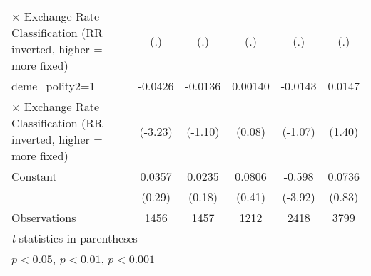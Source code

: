 {\begin{tabular}{l*{5}{c}}
$\times$ Exchange Rate Classification (RR inverted, higher = more fixed)&         (.)         &         (.)         &         (.)         &         (.)         &         (.)         \\
[1em]
deme\_polity2=1      &     -0.0426\sym{**} &     -0.0136         &     0.00140         &     -0.0143         &      0.0147         \\
$\times$ Exchange Rate Classification (RR inverted, higher = more fixed)&     (-3.23)         &     (-1.10)         &      (0.08)         &     (-1.07)         &      (1.40)         \\
[1em]
Constant            &      0.0357         &      0.0235         &      0.0806         &      -0.598\sym{***}&      0.0736         \\
                    &      (0.29)         &      (0.18)         &      (0.41)         &     (-3.92)         &      (0.83)         \\
\hline
Observations        &        1456         &        1457         &        1212         &        2418         &        3799         \\
\hline\hline
\multicolumn{6}{l}{\footnotesize \textit{t} statistics in parentheses}\\
\multicolumn{6}{l}{\footnotesize \sym{*} \(p<0.05\), \sym{**} \(p<0.01\), \sym{***} \(p<0.001\)}\\
\end{tabular}
}
